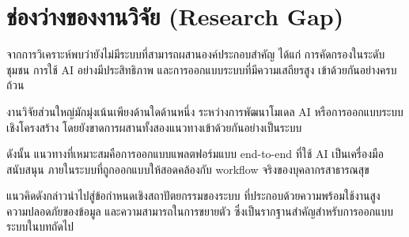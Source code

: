 \section{ช่องว่างของงานวิจัย (Research Gap)}

จากการวิเคราะห์พบว่ายังไม่มีระบบที่สามารถผสานองค์ประกอบสำคัญ ได้แก่
การคัดกรองในระดับชุมชน การใช้ AI อย่างมีประสิทธิภาพ
และการออกแบบระบบที่มีความเสถียรสูง เข้าด้วยกันอย่างครบถ้วน

งานวิจัยส่วนใหญ่มักมุ่งเน้นเพียงด้านใดด้านหนึ่ง
ระหว่างการพัฒนาโมเดล AI หรือการออกแบบระบบเชิงโครงสร้าง
โดยยังขาดการผสานทั้งสองแนวทางเข้าด้วยกันอย่างเป็นระบบ

ดังนั้น แนวทางที่เหมาะสมคือการออกแบบแพลตฟอร์มแบบ end-to-end
ที่ใช้ AI เป็นเครื่องมือสนับสนุน
ภายในระบบที่ถูกออกแบบให้สอดคล้องกับ workflow จริงของบุคลากรสาธารณสุข

แนวคิดดังกล่าวนำไปสู่ข้อกำหนดเชิงสถาปัตยกรรมของระบบ
ที่ประกอบด้วยความพร้อมใช้งานสูง ความปลอดภัยของข้อมูล
และความสามารถในการขยายตัว
ซึ่งเป็นรากฐานสำคัญสำหรับการออกแบบระบบในบทถัดไป
